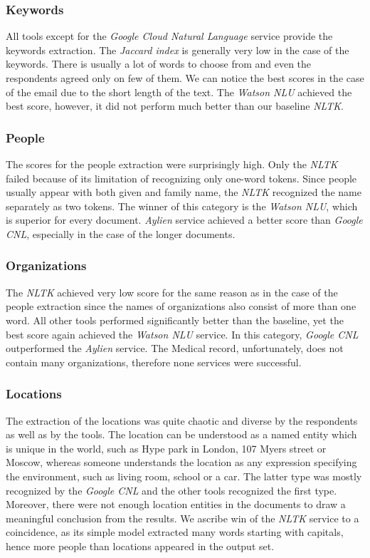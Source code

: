 \documentclass[
  digital, %
  table,   %
  lof,     %
  lot,     %
]{fithesis3}
\begin{document}
\subsubsection{\textbf{Keywords}}
All tools except for the \textit{Google Cloud Natural Language} service provide the keywords extraction.
The \textit{Jaccard index} is generally very low in the case of the keywords.
There is usually a lot of words to choose from and even the respondents agreed only on few of them.
We can notice the best scores in the case of the email due to the short length of the text.
The \textit{Watson NLU} achieved the best score, however, it did not perform much better than our baseline \textit{NLTK}.

\subsubsection{\textbf{People}}
The scores for the people extraction were surprisingly high.
Only the \textit{NLTK} failed because of its limitation of recognizing only one-word tokens.
Since people usually appear with both given and family name, the \textit{NLTK} recognized the name separately as two tokens.
The winner of this category is the \textit{Watson NLU}, which is superior for every document.
\textit{Aylien} service achieved a better score than \textit{Google CNL}, especially in the case of the longer documents.

\subsubsection{\textbf{Organizations}}
The \textit{NLTK} achieved very low score for the same reason as in the case of the people extraction since the names of organizations also consist of more than one word.
All other tools performed significantly better than the baseline, yet the best score again achieved the \textit{Watson NLU} service.
In this category, \textit{Google CNL} outperformed the \textit{Aylien} service.
The Medical record, unfortunately, does not contain many organizations, therefore none services were successful.

\subsubsection{\textbf{Locations}}
The extraction of the locations was quite chaotic and diverse by the respondents as well as by the tools.
The location can be understood as a named entity which is unique in the world, such as Hype park in London, 107 Myers street or Moscow, whereas someone understands the location as any expression specifying the environment, such as living room, school or a car.
The latter type was mostly recognized by the \textit{Google CNL} and the other tools recognized the first type.
Moreover, there were not enough location entities in the documents to draw a meaningful conclusion from the results.
We ascribe win of the \textit{NLTK} service to a coincidence, as its simple model extracted many words starting with capitals, hence more people than locations appeared in the output set.
\end{document}
